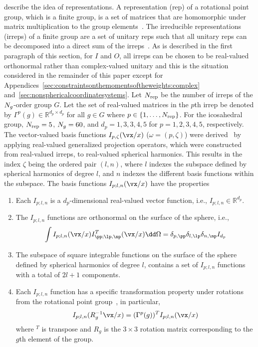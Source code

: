 describe the idea of representations.
A representation (rep) of a rotational point group, which is a finite
group, is a set of matrices that are homomorphic under matrix
multiplication to the group elements~\cite[p.~61]{Miller1972}.
The irreducible representations (irreps) of a finite group are a set of
unitary reps such that all unitary reps can be decomposed into a direct sum
of the irreps~\cite[Theorem~3.3 p.~69]{Miller1972}.
As is described in the first paragraph of this section, for $I$ and $O$,
all irreps can be chosen to be real-valued orthonormal rather than
complex-valued unitary and this is the situation considered in the
remainder of this paper except for
Appendices~\ref{sec:constraintsonthemomentsoftheweights:complex}
and~\ref{sec:nonsphericalcoordinatesystems}.
Let $N_{\rm rep}$ be the number of irreps of the $N_g$-order group $G$.
Let the set of real-valued matrices in the $p$th irrep be denoted by
$\Gamma^p(g)\in\mathbb{R}^{d_p\times d_p}$ for all $g\in G$ where
$p\in\{1,\dots,N_{\rm rep}\}$.
For the icosahedral group, $N_{\rm rep}=5$, $N_g=60$, and
$d_p=1,3,3,4,5$ for $p=1,2,3,4,5$, respectively.
The vector-valued basis functions $I_{p,\zeta}(\vx/x)$
($\omega=(p,\zeta)$) were derived~\cite{XuDoerschukBasisFunctions2017} by
applying real-valued generalized projection operators, which were
constructed from real-valued irreps, to real-valued spherical harmonics.
This results in the index $\zeta$ being the ordered pair $(l,n)$,
where $l$ indexes the subspace defined by spherical harmonics of degree $l$,
and $n$ indexes the different basis functions within the subspace.
The basis functions $I_{p;l,n}(\vx/x)$ have the properties
\begin{enumerate}
\item
Each $I_{p;l,n}$ is a $d_p$-dimensional real-valued vector function, i.e.,
$I_{p;l,n}\in \mathbb{R}^{d_p}$.
\item
The $I_{p;l,n}$ functions are orthonormal on the surface of the sphere,
i.e.,
\begin{equation}
\int
I_{p;l,n}(\vx/x)
I_{\pp;\lp,\np}^T(\vx/x)
\dd\Omega
=
\delta_{p,\pp}
\delta_{l,\lp}
\delta_{n,\np}
I_{d_p}
\label{eq:orthonormalityofangularbasisfunctions}
\end{equation}
\item
The subspace of square integrable functions on the surface of the sphere
defined by spherical harmonics of degree $l$, contains a set of $I_{p;l,n}$
functions with a total of $2l+1$ components.
\item
Each $I_{p;l,n}$ function has a specific transformation property under
rotations from the rotational point group~\cite[p.~20]{Cornwell1984}, in
particular,
\begin{equation}
I_{p;l,n}(R_g^{-1} \vx/x)
=
(\Gamma^p(g))^T
I_{p;l,n}(\vx/x)
\label{eq:transformationEqn}
\end{equation}
where ${}^T$ is transpose and $R_g$ is the
$3\times 3$ rotation matrix corresponding to the $g$th element of the
group.
\end{enumerate}
